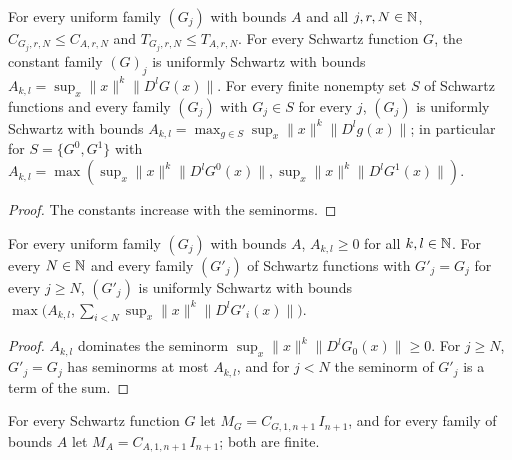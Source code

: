 \begin{lemma}
\label{lem:uniform-schwartz-constants}
\leanok
{}
For every uniform family $(G_j)$ with bounds $A$ and all $j, r, N \in \mathbb{N}$,
$C_{G_j,r,N} \leq C_{A,r,N}$ and $T_{G_j,r,N} \leq T_{A,r,N}$. For every Schwartz function $G$,
the constant family $(G)_j$ is uniformly Schwartz with bounds
$A_{k,l} = \sup_x \|x\|^k \|D^l G(x)\|$. For every finite nonempty set $S$
of Schwartz functions and every family $(G_j)$ with $G_j \in S$ for every $j$, $(G_j)$ is
uniformly Schwartz with bounds $A_{k,l} = \max_{g \in S} \sup_x \|x\|^k \|D^l g(x)\|$; in
particular for $S = \{G^0, G^1\}$ with
$A_{k,l} = \max(\sup_x \|x\|^k \|D^l G^0(x)\|, \sup_x \|x\|^k \|D^l G^1(x)\|)$.
\end{lemma}

\begin{proof}
\leanok
The constants increase with the seminorms.
\end{proof}

\begin{lemma}
\label{lem:uniform-schwartz-exceptions}
\leanok
{}
For every uniform family $(G_j)$ with bounds $A$, $A_{k,l} \geq 0$ for all $k, l \in \mathbb{N}$. For
every $N \in \mathbb{N}$ and every family $(G'_j)$ of Schwartz functions with $G'_j = G_j$ for every
$j \geq N$, $(G'_j)$ is uniformly Schwartz with bounds
$\max \bigl( A_{k,l}, \sum_{i < N} \sup_x \|x\|^k \|D^l G'_i(x)\| \bigr)$.
\end{lemma}

\begin{proof}
\leanok
$A_{k,l}$ dominates the seminorm $\sup_x \|x\|^k \|D^l G_0(x)\| \geq 0$. For $j \geq N$,
$G'_j = G_j$ has seminorms at most $A_{k,l}$, and for $j < N$ the seminorm of $G'_j$ is a term of
the sum.
\end{proof}

\begin{definition}
\label{def:gradient-mass}
\leanok
{}
For every Schwartz function $G$ let $M_G = C_{G,1,n+1} \, I_{n+1}$, and for every family of
bounds $A$ let $M_A = C_{A,1,n+1} \, I_{n+1}$; both are finite.
\end{definition}

